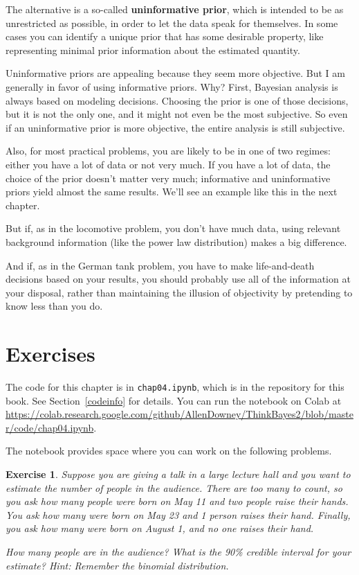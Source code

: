 \documentclass[12pt]{book}
\theoremstyle{exercise}
\newtheorem{exercise}{Exercise}[chapter]
\begin{document}
The alternative is a so-called {\bf uninformative prior}, which is
intended to be as unrestricted as possible, in order to let the data
speak for themselves.  In some cases you can identify a unique prior
that has some desirable property, like representing minimal prior
information about the estimated quantity.

Uninformative priors are appealing because they seem more
objective.  But I am generally in favor of using informative priors.
Why?  First, Bayesian analysis is always based on
modeling decisions.  Choosing the prior is one of those decisions, but
it is not the only one, and it might not even be the most subjective.
So even if an uninformative prior is more objective, the entire analysis
is still subjective.


Also, for most practical problems, you are likely to be in one of two
regimes: either you have a lot of data or not very much.  If you have
a lot of data, the choice of the prior doesn't matter very much;
informative and uninformative priors yield almost the same results.
We'll see an example like this in the next chapter.

But if, as in the locomotive problem, you don't have much data,
using relevant background information (like the power law distribution)
makes a big difference.

And if, as in the German tank problem, you have to make life-and-death
decisions based on your results, you should probably use all of the
information at your disposal, rather than maintaining the illusion of
objectivity by pretending to know less than you do.


\section{Exercises}

The code for this chapter is in {\tt chap04.ipynb}, which is in the repository for this book.  See Section~\ref{codeinfo} for details.
You can run the notebook on Colab at \url{https://colab.research.google.com/github/AllenDowney/ThinkBayes2/blob/master/code/chap04.ipynb}.

The notebook provides space where you can work on the following problems.


\begin{exercise}
Suppose you are giving a talk in a large lecture hall and you want to estimate the number of people in the audience.  There are too many to count, so you ask how many people were born on May 11 and two people raise their hands.  You ask how many were born on May 23 and 1 person raises their hand.  Finally, you ask how many were born on August 1, and no one raises their hand.

How many people are in the audience?  What is the 90\% credible interval for your estimate?  Hint: Remember the binomial distribution.
\end{exercise}
\end{document}

